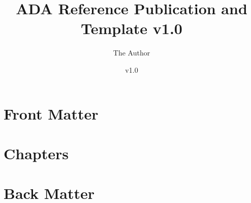 \documentclass[11pt]{book}
\title{ADA Reference Publication and Template v1.0}
\author{The Author}
\date{v1.0}
\begin{document}
\maketitle
\def\title#1{\chapter{#1}}
\tableofcontents

\part{Front Matter}
        
        
\part{Chapters}
        
        
        
        
        
        
\part{Back Matter}
        
        


\printbibliography[title={Bibliography}]
\end{document}
